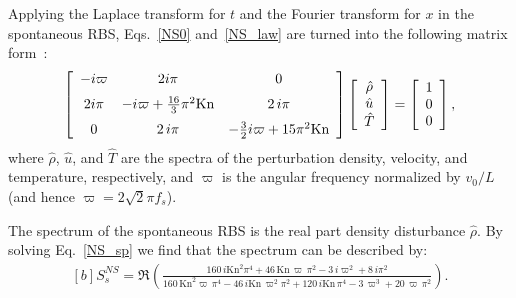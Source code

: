 Applying the Laplace transform for $t$ and the Fourier transform for $x$ in the spontaneous RBS, Eqs.~\eqref{NS0} and~\eqref{NS_law} are turned into the following matrix form~\cite{Marques1993}:	
\begin{equation}\label{NS_sp}
\left[ \begin {array}{cccc} -i\varpi&2i\pi&0\\ \noalign{\medskip}
2i\pi&-i\varpi+\frac{16}{3}\pi^2 \text{Kn}&2\,i\pi
\\ \noalign{\medskip}0&2\,i\pi&-\frac{3}{2}i\varpi+15\pi^2\text{Kn}
\end {array} \right]
\left[ \begin {array}{cccc} \hat{\rho} \\ \hat{u}
\\ \hat{T}
\end {array} \right] =
\left[ \begin {array}{cccc} 1\\ 0
\\ 0
\end {array} \right],  
\end{equation}
where $\hat{\rho}$, $\hat{u}$, and $\hat{T}$ are the spectra of the perturbation density, velocity, and temperature, respectively, and $\varpi$ is the angular frequency normalized by $v_0/L$ (and hence $\varpi=2\sqrt{2}\pi{}f_s$). 


The spectrum of the spontaneous RBS is the real part density disturbance $\hat{\rho}$. By solving Eq.~\eqref{NS_sp}  we find that the spectrum can be described by:
\begin{equation*}\label{spectrum_NS}
\begin{aligned}[b]
S_s^{NS}=\Re\left(\frac {160\,i{\text{Kn}}^{2}{\pi}^{4}+46\,{ \text{Kn}}\,\varpi\,{\pi}^{2}-
	3\,i{\varpi}^{2}+8\,i{\pi}^{2}}{160\,{
		\text{Kn}}^{2}\varpi\,{\pi}^{4}-46\,i\text{Kn}\,{\varpi}^{2}{\pi}^{2}+
	120\,i\text{Kn}\,{\pi}^{4}-3\,{\varpi}^{3}+20\,\varpi\,{\pi}^{2}}\right).
\end{aligned}
\end{equation*}


